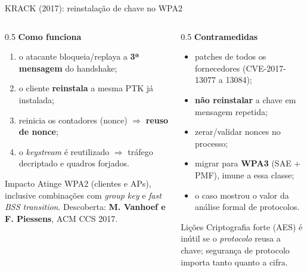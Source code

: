 \documentclass[aspectratio=169,11pt]{beamer}
\begin{document}
\begin{frame}{KRACK (2017): reinstalação de chave no WPA2}
  \begin{columns}
    \begin{column}{0.5\textwidth}
      \textbf{Como funciona}
      \begin{enumerate}
        \item o atacante bloqueia/replaya a \textbf{3ª mensagem} do handshake;
        \item o cliente \textbf{reinstala} a mesma PTK já instalada;
        \item reinicia os contadores (nonce) $\Rightarrow$ \textbf{reuso de nonce};
        \item o \emph{keystream} é reutilizado $\Rightarrow$ tráfego decriptado e quadros forjados.
      \end{enumerate}
      \begin{alertblock}{Impacto}
        Atinge WPA2 (clientes e APs), inclusive combinações com \emph{group key} e \emph{fast BSS transition}. Descoberta: \textbf{M. Vanhoef e F. Piessens}, ACM CCS 2017.
      \end{alertblock}
    \end{column}
    \begin{column}{0.5\textwidth}
      \textbf{Contramedidas}
      \begin{itemize}
        \item patches de todos os fornecedores (CVE-2017-13077 a 13084);
        \item \textbf{não reinstalar} a chave em mensagem repetida;
        \item zerar/validar nonces no processo;
        \item migrar para \textbf{WPA3} (SAE + PMF), imune a essa classe;
        \item o caso mostrou o valor da análise formal de protocolos.
      \end{itemize}
      \begin{exampleblock}{Lições}
        Criptografia forte (AES) é inútil se o \emph{protocolo} reusa a chave; segurança de protocolo importa tanto quanto a cifra.
      \end{exampleblock}
    \end{column}
  \end{columns}
\end{frame}
\end{document}
